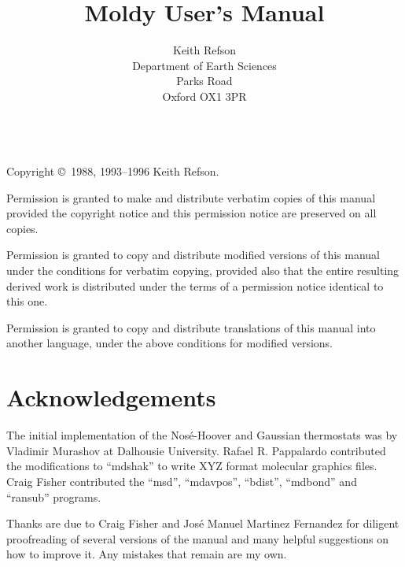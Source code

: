 \documentclass[a4paper,twoside]{report}
\title{Moldy User's Manual}
\author{Keith Refson\\Department of Earth Sciences\\Parks Road
\\Oxford OX1 3PR\\
\htmladdnormallink{Keith.Refson@earth.ox.ac.uk}{mailto:Keith.Refson@earth.ox.ac.uk}\\}
\begin{document}
\maketitle
\thispagestyle{empty}

Copyright \copyright\ 1988, 1993--1996 Keith Refson.

   Permission is granted to make and distribute verbatim copies of this
manual provided the copyright notice and this permission notice are
preserved on all copies.

   Permission is granted to copy and distribute modified versions of
this manual under the conditions for verbatim copying, provided also
that the entire resulting derived work is distributed under the terms
of a permission notice identical to this one.

   Permission is granted to copy and distribute translations of this
manual into another language, under the above conditions for modified
versions.

\section*{Acknowledgements} %
The initial implementation of the Nos\'{e}-Hoover and Gaussian
thermostats was by Vladimir Murashov at Dalhousie University.
Rafael R. Pappalardo contributed the modifications to ``mdshak'' to
write XYZ format molecular graphics files. Craig Fisher contributed
the ``msd'', ``mdavpos'', ``bdist'', ``mdbond'' and ``ransub'' programs.

Thanks are due to Craig Fisher and Jos\'{e} Manuel Martinez Fernandez
for diligent proofreading of several versions of the manual and many
helpful suggestions on how to improve it.  Any mistakes that remain are
my own.

\cleardoublepage
\setcounter{page}{1}
\tableofcontents
\listoftables
\listoffigures

\cleardoublepage
{}
\setcounter{page}{1}
\end{document}
